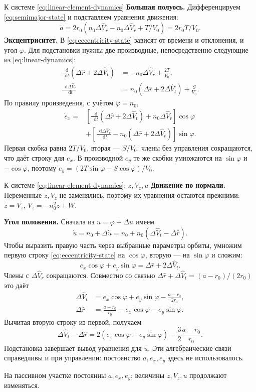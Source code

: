 \documentclass[a4paper,11pt]{article}
\newcommand{\dd}{\mathop{}\!\mathrm d}
\numberwithin{equation}{section}
\theoremstyle{remark}
\begin{document}
\begin{explanation}{К системе \eqref{eq:linear-element-dynamics}}
\textbf{Большая полуось.} Дифференцируем \eqref{eq:semimajor-state}
и подставляем уравнения движения:
\[
\dot a=2r_0\left(n_0\Delta\widehat V_r
              -n_0\Delta\widehat V_r+T/V_0\right)=2r_0T/V_0.
\]
\textbf{Эксцентриситет.} В \eqref{eq:eccentricity-state} зависят
от времени и отклонения, и угол $\varphi$. Для подстановки нужны
две производные, непосредственно следующие из
\eqref{eq:linear-dynamics}:
\[
\begin{aligned}
\frac{\dd}{\dd t}(\Delta\widehat r+2\Delta\widehat V_t)
 &=-n_0\Delta\widehat V_r+\frac{2T}{V_0},\\
\frac{\dd\Delta\widehat V_r}{\dd t}
 &=n_0(\Delta\widehat r+2\Delta\widehat V_t)+\frac{S}{V_0}.
\end{aligned}
\]
По правилу произведения, с учётом $\dot\varphi=n_0$,
\[
\begin{aligned}
\dot e_x={}&
 \left[\frac{\dd}{\dd t}(\Delta\widehat r+2\Delta\widehat V_t)
                   +n_0\Delta\widehat V_r\right]\cos\varphi\\
 &+\left[\frac{\dd\Delta\widehat V_r}{\dd t}
              -n_0(\Delta\widehat r+2\Delta\widehat V_t)\right]\sin\varphi.
\end{aligned}
\]
Первая скобка равна $2T/V_0$, вторая --- $S/V_0$:
члены без управления сокращаются, что даёт строку для $\dot e_x$.
В производной $e_y$ те же скобки умножаются на $\sin\varphi$
и $-\cos\varphi$, поэтому
$\dot e_y=(2T\sin\varphi-S\cos\varphi)/V_0$.
\end{explanation}
\begin{explanation}{К системе \eqref{eq:linear-element-dynamics}: $z,V_z,u$}
\textbf{Движение по нормали.} Переменные $z,V_z$ не заменялись,
поэтому их уравнения остаются прежними:
$\dot z=V_z$, $\dot V_z=-n_0^2z+W$.

\textbf{Угол положения.} Сначала из $u=\varphi+\Delta u$ имеем
\[
\dot u=n_0+\Delta\dot u
       =n_0+n_0(\Delta\widehat V_t-\Delta\widehat r).
\]
Чтобы выразить правую часть через выбранные параметры орбиты,
умножим первую строку \eqref{eq:eccentricity-state} на
$\cos\varphi$, вторую --- на $\sin\varphi$ и сложим:
\[
e_x\cos\varphi+e_y\sin\varphi
=\Delta\widehat r+2\Delta\widehat V_t.
\]
Члены с $\Delta\widehat V_r$ сокращаются. Совместно со связью
$\Delta\widehat r+\Delta\widehat V_t=(a-r_0)/(2r_0)$ это даёт
\[
\begin{aligned}
\Delta\widehat V_t&=e_x\cos\varphi+e_y\sin\varphi-\frac{a-r_0}{2r_0},\\
\Delta\widehat r&=\frac{a-r_0}{r_0}-e_x\cos\varphi-e_y\sin\varphi.
\end{aligned}
\]
Вычитая вторую строку из первой, получаем
\[
\Delta\widehat V_t-\Delta\widehat r
=2(e_x\cos\varphi+e_y\sin\varphi)-\frac32\frac{a-r_0}{r_0}.
\]
Подстановка завершает вывод уравнения для $u$.
Эти алгебраические связи справедливы и при управлении:
постоянство $a,e_x,e_y$ здесь не использовалось.
\end{explanation}
На пассивном участке постоянны $a,e_x,e_y$;
величины $z,V_z,u$ продолжают изменяться.
\end{document}
